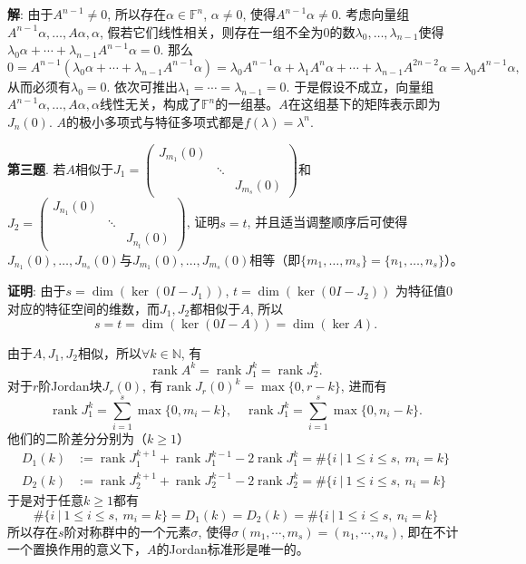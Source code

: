 {\bf 解}: 由于$A^{n-1} \neq 0$, 所以存在$\alpha \in \mathbb{F}^n$, $\alpha \neq 0$, 使得$A^{n-1} \alpha \neq 0$. 考虑向量组$A^{n-1} \alpha, \ldots, A\alpha, \alpha$, 假若它们线性相关，则存在一组不全为$0$的数$\lambda_0, \ldots, \lambda_{n-1}$使得$\lambda_0 \alpha + \cdots + \lambda_{n-1} A^{n-1} \alpha = 0$. 那么
$$0 = A^{n-1}(\lambda_0 \alpha + \cdots + \lambda_{n-1} A^{n-1} \alpha) = \lambda_0 A^{n-1} \alpha + \lambda_1 A^{n} \alpha + \cdots + \lambda_{n-1} A^{2n-2} \alpha = \lambda_0 A^{n-1} \alpha,$$
从而必须有$\lambda_0 = 0$. 依次可推出$\lambda_1 = \cdots = \lambda_{n-1} = 0$. 于是假设不成立，向量组$A^{n-1} \alpha, \ldots, A\alpha, \alpha$线性无关，构成了$\mathbb{F}^n$的一组基。$A$在这组基下的矩阵表示即为$J_n(0)$. $A$的极小多项式与特征多项式都是$f(\lambda) = \lambda^n$.

\newpageorvspace

{\bf 第三题}. 若$A$相似于$J_1 = \begin{pmatrix} J_{m_1}(0) & & \\ & \ddots & \\ & & J_{m_s}(0) \end{pmatrix}$和$J_2 = \begin{pmatrix} J_{n_1}(0) & & \\ & \ddots & \\ & & J_{n_t}(0) \end{pmatrix}$, 证明$s=t$, 并且适当调整顺序后可使得$J_{n_1}(0), \ldots, J_{n_s}(0)$与$J_{m_1}(0), \ldots, J_{m_s}(0)$相等（即$\{ m_1, \ldots, m_s \} = \{ n_1, \ldots, n_s \}$）。

{\bf 证明}: 由于$s = \dim (\ker (0 I - J_1))$, $t = \dim (\ker (0 I - J_2))$ 为特征值$0$对应的特征空间的维数，而$J_1, J_2$都相似于$A$, 所以
$$s = t = \dim(\ker (0 I - A)) = \dim(\ker A).$$

由于$A, J_1, J_2$相似，所以$\forall k \in \mathbb{N}$, 有
$$\operatorname{rank} A^k = \operatorname{rank} J_1^k = \operatorname{rank} J_2^k.$$
对于$r$阶Jordan块$J_r(0)$, 有$\operatorname{rank} J_r(0)^k = \max \{ 0, r-k \}$, 进而有
$$\operatorname{rank} J_1^k = \sum_{i=1}^s \max \{ 0, m_i-k \}, \quad \operatorname{rank} J_1^k = \sum_{i=1}^s \max \{ 0, n_i-k \}.$$
他们的二阶差分分别为（$k\geqslant 1$）
\begin{align*}
D_1(k) & := \operatorname{rank} J_1^{k+1} + \operatorname{rank} J_1^{k-1} - 2 \operatorname{rank} J_1^{k} = \# \{ i \ |\ 1 \leqslant i \leqslant s, ~ m_i = k \} \\
D_2(k) & := \operatorname{rank} J_2^{k+1} + \operatorname{rank} J_2^{k-1} - 2 \operatorname{rank} J_2^{k} = \# \{ i \ |\ 1 \leqslant i \leqslant s, ~ n_i = k \}
\end{align*}
于是对于任意$k\geqslant 1$都有
$$\# \{ i \ |\ 1 \leqslant i \leqslant s, ~ m_i = k \} = D_1(k) = D_2(k) = \# \{ i \ |\ 1 \leqslant i \leqslant s, ~ n_i = k \}$$
所以存在$s$阶对称群中的一个元素$\sigma$, 使得$\sigma(m_1, \cdots, m_s) = (n_1, \cdots, n_s)$, 即在不计一个置换作用的意义下，$A$的Jordan标准形是唯一的。

